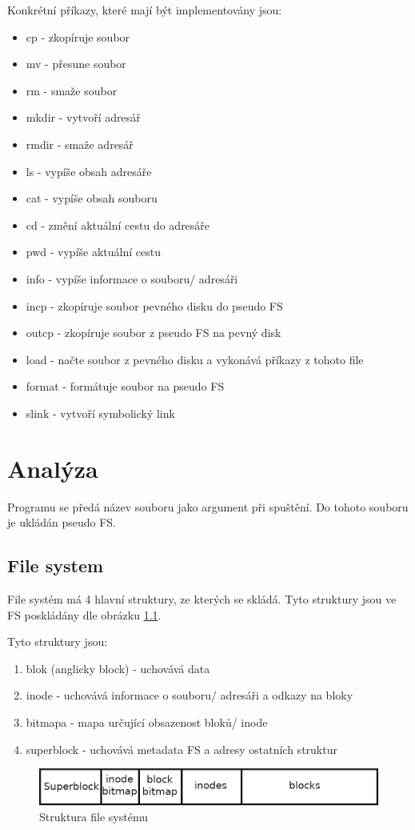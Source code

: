 \documentclass[12pt]{report}
\begin{document}
Konkrétní příkazy, které mají být implementovány jsou:
\begin{itemize}
	\item cp - zkopíruje soubor
	\item mv - přesune soubor
	\item rm - smaže soubor
	\item mkdir - vytvoří adresář
	\item rmdir - smaže adresář
	\item ls - vypíše obsah adresáře
	\item cat - vypíše obsah souboru
	\item cd - změní aktuální cestu do adresáře
	\item pwd - vypíše aktuální cestu
	\item info - vypíše informace o souboru/ adresáři
	\item incp - zkopíruje soubor pevného disku do pseudo FS
	\item outcp - zkopíruje soubor z pseudo FS na pevný disk
	\item load - načte soubor z pevného disku a vykonává příkazy z tohoto file
	\item format - formátuje soubor na pseudo FS
	\item slink - vytvoří symbolický link
\end{itemize}
%
%
\chapter{Analýza}
Programu se předá název souboru jako argument při spuštění. Do tohoto souboru je ukládán pseudo FS.
\section{File system}
File systém má 4 hlavní struktury, ze kterých se skládá. Tyto struktury jsou ve FS poskládány dle
obrázku \ref{img:fs_structure}.

Tyto struktury jsou:
\begin{enumerate}
	\item blok (anglicky block) - uchovává data
	\item inode - uchovává informace o souboru/ adresáři a odkazy na bloky
	\item bitmapa - mapa určující obsazenost bloků/ inode
	\item superblock - uchovává metadata FS a adresy ostatních struktur
\end{enumerate}
%
\begin{figure}[H]
	\centering
	\includegraphics[width=\textwidth]{img/fs_structure.png}
	\caption{Struktura file systému}
	\label{img:fs_structure}
\end{figure}
%
\end{document}

